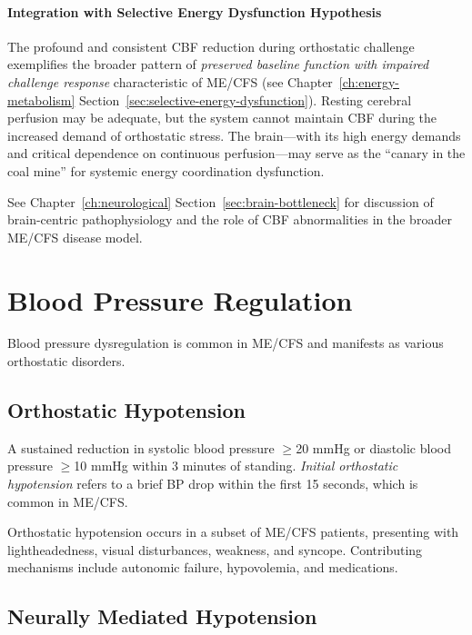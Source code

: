 \paragraph{Integration with Selective Energy Dysfunction Hypothesis}

The profound and consistent CBF reduction during orthostatic challenge exemplifies the broader pattern of \emph{preserved baseline function with impaired challenge response} characteristic of ME/CFS (see Chapter~\ref{ch:energy-metabolism} Section~\ref{sec:selective-energy-dysfunction}). Resting cerebral perfusion may be adequate, but the system cannot maintain CBF during the increased demand of orthostatic stress. The brain---with its high energy demands and critical dependence on continuous perfusion---may serve as the ``canary in the coal mine'' for systemic energy coordination dysfunction.

See Chapter~\ref{ch:neurological} Section~\ref{sec:brain-bottleneck} for discussion of brain-centric pathophysiology and the role of CBF abnormalities in the broader ME/CFS disease model.

\section{Blood Pressure Regulation}
\label{sec:blood-pressure}

Blood pressure dysregulation is common in ME/CFS and manifests as various orthostatic disorders.

\subsection{Orthostatic Hypotension}
\label{sec:orthostatic-hypotension}

\begin{definition}
A sustained reduction in systolic blood pressure $\geq$20 mmHg or diastolic blood pressure $\geq$10 mmHg within 3 minutes of standing. \emph{Initial orthostatic hypotension} refers to a brief BP drop within the first 15 seconds, which is common in ME/CFS.
\end{definition}

Orthostatic hypotension occurs in a subset of ME/CFS patients, presenting with lightheadedness, visual disturbances, weakness, and syncope. Contributing mechanisms include autonomic failure, hypovolemia, and medications.

\subsection{Neurally Mediated Hypotension}
\label{sec:nmh}

